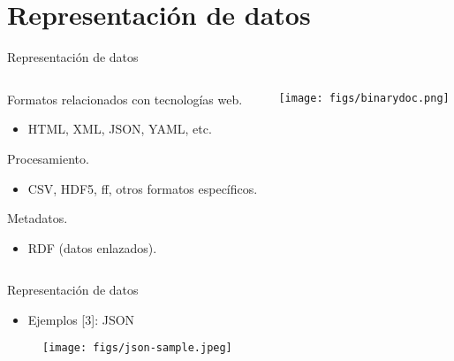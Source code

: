 
\section{Representación de datos}

\begin{frame}{Representación de datos}
 \begin{columns}[T]
    \begin{column}{.75\textwidth}
  \begin{wideitemize}
  \item Formatos relacionados con tecnologías web.
  \begin{itemize}
   \item HTML, XML, JSON, YAML, etc.
  \end{itemize}

  \item Procesamiento.
  \begin{itemize}
   \item CSV, HDF5, ff, otros formatos específicos.
  \end{itemize}
  
  \item Metadatos.
  \begin{itemize}
   \item RDF (datos enlazados).
  \end{itemize}

 \end{wideitemize}
    \end{column}
    \begin{column}{.25\textwidth}
    \vspace*{0.8cm}
    \texttt{[image: figs/binarydoc.png]}
    \end{column}
  \end{columns}

\end{frame}


\begin{frame}{Representación de datos}
\begin{itemize}
 \item Ejemplos [3]: JSON
\end{itemize}

 \begin{figure}
  \centering
  \texttt{[image: figs/json-sample.jpeg]} 
\end{figure}

\end{frame}

